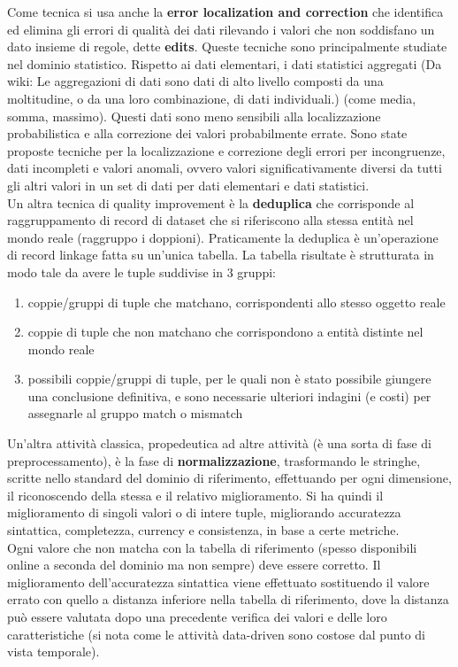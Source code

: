 Come tecnica si usa anche la \textbf{error localization and correction} che identifica ed elimina gli errori di qualità dei dati rilevando i valori che non soddisfano un dato insieme di regole, dette \textbf{edits}. Queste tecniche sono principalmente studiate nel dominio statistico.
Rispetto ai dati elementari, i dati statistici aggregati (Da wiki: Le aggregazioni di dati sono dati di alto livello composti da una moltitudine, o da una loro combinazione, di dati individuali.) (come media, somma, massimo).
Questi dati sono meno sensibili alla localizzazione probabilistica e alla correzione dei valori probabilmente errate. Sono state proposte tecniche per la localizzazione e correzione degli errori per incongruenze, dati incompleti e valori anomali, ovvero valori significativamente diversi da tutti gli altri valori in un set di dati per dati elementari e dati statistici.\\

Un altra tecnica di quality improvement è la \textbf{deduplica} che corrisponde al raggruppamento di record di dataset che si riferiscono alla stessa entità nel mondo reale (raggruppo i doppioni). Praticamente la deduplica è un'operazione di record linkage fatta su un'unica tabella. La tabella risultate è strutturata in modo tale da avere le tuple suddivise in 3 gruppi:
\begin{enumerate}
    \item coppie/gruppi di tuple che matchano, corrispondenti allo stesso oggetto reale
    \item coppie di tuple che non matchano che corrispondono a entità distinte nel mondo reale 
    \item possibili coppie/gruppi di tuple, per le quali non è stato possibile giungere una conclusione definitiva, e sono necessarie ulteriori indagini (e costi) per assegnarle al gruppo match o mismatch
    
\end{enumerate}
Un'altra attività classica, propedeutica ad altre attività (è una sorta di fase di preprocessamento), è la fase di \textbf{normalizzazione}, trasformando le stringhe, scritte nello standard del dominio di riferimento, effettuando per ogni dimensione, il riconoscendo della stessa e il relativo miglioramento. Si ha quindi il miglioramento di singoli valori o di intere tuple, migliorando accuratezza sintattica, completezza, currency e consistenza, in base a certe metriche. \\ 

Ogni valore che non matcha con la tabella di riferimento (spesso disponibili online a seconda del dominio ma non sempre) deve essere corretto. Il miglioramento dell'accuratezza sintattica viene effettuato sostituendo il valore errato con quello a distanza inferiore nella tabella di riferimento, dove la distanza può essere valutata dopo una precedente verifica dei valori e delle loro caratteristiche (si nota come le attività data-driven sono costose dal punto di vista temporale). \\

